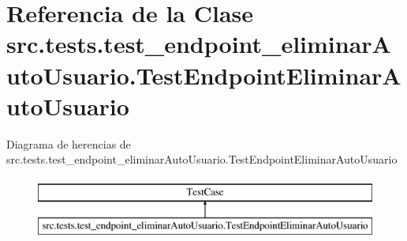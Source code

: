 \hypertarget{classsrc_1_1tests_1_1test__endpoint__eliminar_auto_usuario_1_1_test_endpoint_eliminar_auto_usuario}{\section{Referencia de la Clase src.\-tests.\-test\-\_\-endpoint\-\_\-eliminar\-Auto\-Usuario.\-Test\-Endpoint\-Eliminar\-Auto\-Usuario}
\label{classsrc_1_1tests_1_1test__endpoint__eliminar_auto_usuario_1_1_test_endpoint_eliminar_auto_usuario}
}
Diagrama de herencias de src.\-tests.\-test\-\_\-endpoint\-\_\-eliminar\-Auto\-Usuario.\-Test\-Endpoint\-Eliminar\-Auto\-Usuario\begin{figure}[H]
\begin{center}
\leavevmode
\includegraphics[height=2.000000cm]{classsrc_1_1tests_1_1test__endpoint__eliminar_auto_usuario_1_1_test_endpoint_eliminar_auto_usuario}
\end{center}
\end{figure}
